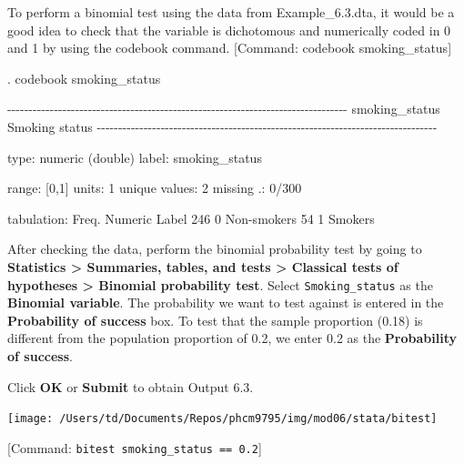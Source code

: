 \documentclass[
]{memoir}
\newenvironment{Shaded}{\begin{snugshade}}{\end{snugshade}}
\newcommand{\NormalTok}[1]{#1}
\begin{document}
To perform a binomial test using the data from Example\_6.3.dta, it would be a good idea to check that the variable is dichotomous and numerically coded in 0 and 1 by using the codebook command. {[}Command: codebook smoking\_status{]}

\begin{Shaded}
\begin{Highlighting}[]
\NormalTok{. codebook smoking\_status }

\NormalTok{{-}{-}{-}{-}{-}{-}{-}{-}{-}{-}{-}{-}{-}{-}{-}{-}{-}{-}{-}{-}{-}{-}{-}{-}{-}{-}{-}{-}{-}{-}{-}{-}{-}{-}{-}{-}{-}{-}{-}{-}{-}{-}{-}{-}{-}{-}{-}{-}{-}{-}{-}{-}{-}{-}{-}{-}{-}{-}{-}{-}{-}{-}{-}{-}{-}{-}{-}{-}{-}{-}{-}{-}{-}{-}{-}{-}{-}{-}{-}{-}}
\NormalTok{smoking\_status                                                    Smoking status}
\NormalTok{{-}{-}{-}{-}{-}{-}{-}{-}{-}{-}{-}{-}{-}{-}{-}{-}{-}{-}{-}{-}{-}{-}{-}{-}{-}{-}{-}{-}{-}{-}{-}{-}{-}{-}{-}{-}{-}{-}{-}{-}{-}{-}{-}{-}{-}{-}{-}{-}{-}{-}{-}{-}{-}{-}{-}{-}{-}{-}{-}{-}{-}{-}{-}{-}{-}{-}{-}{-}{-}{-}{-}{-}{-}{-}{-}{-}{-}{-}{-}{-}}

\NormalTok{                  type:  numeric (double)}
\NormalTok{                 label:  smoking\_status}

\NormalTok{                 range:  [0,1]                        units:  1}
\NormalTok{         unique values:  2                        missing .:  0/300}

\NormalTok{            tabulation:  Freq.   Numeric  Label}
\NormalTok{                           246         0  Non{-}smokers}
\NormalTok{                            54         1  Smokers}
\end{Highlighting}
\end{Shaded}

After checking the data, perform the binomial probability test by going to \textbf{Statistics \textgreater{} Summaries, tables, and tests \textgreater{} Classical tests of hypotheses \textgreater{} Binomial probability test}. Select \texttt{Smoking\_status} as the \textbf{Binomial variable}. The probability we want to test against is entered in the \textbf{Probability of success} box. To test that the sample proportion (0.18) is different from the population proportion of 0.2, we enter 0.2 as the \textbf{Probability of success}.

Click \textbf{OK} or \textbf{Submit} to obtain Output 6.3.

\texttt{[image: /Users/td/Documents/Repos/phcm9795/img/mod06/stata/bitest]}

{[}Command: \texttt{bitest\ smoking\_status\ ==\ 0.2}{]}
\end{document}
